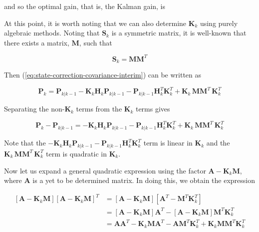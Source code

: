 and so the optimal gain, that is, the Kalman gain, is


At this point, it is worth noting that we can also determine $\mathbf{K}_k$ using purely
algebraic methods. Noting that $\mathbf{S}_k$ is a symmetric matrix, it is well-known
that there exists a matrix, $\mathbf{M}$, such that

\begin{equation*}
    \mathbf{S}_{k} = \mathbf{M} \mathbf{M}^T
\end{equation*}

Then (\ref{eq:state-correction-covariance-interim}) can be written as

\begin{equation*}
    \mathbf{P}_{k} = \mathbf{P}_{k|k-1} - \mathbf{K}_k \mathbf{H}_k \mathbf{P}_{k|k-1} - \mathbf{P}_{k|k-1} \mathbf{H}_k^T \mathbf{K}_k^T
    + \mathbf{K}_k \, \mathbf{M} \mathbf{M}^T \, \mathbf{K}_k^T
\end{equation*}

Separating the non-$\mathbf{K}_k$ terms from the $\mathbf{K}_k$ terms gives

\begin{equation}
    \mathbf{P}_{k} - \mathbf{P}_{k|k-1} = - \mathbf{K}_k \mathbf{H}_k \mathbf{P}_{k|k-1} - \mathbf{P}_{k|k-1} \mathbf{H}_k^T \mathbf{K}_k^T
    + \mathbf{K}_k \, \mathbf{M} \mathbf{M}^T \, \mathbf{K}_k^T
    \label{eq:Pk-Pkm1}
\end{equation}

Note that the $- \mathbf{K}_k \mathbf{H}_k \mathbf{P}_{k|k-1} - \mathbf{P}_{k|k-1} \mathbf{H}_k^T \mathbf{K}_k^T$
term is linear in $\mathbf{K}_{k}$ and the $\mathbf{K}_k \, \mathbf{M} \mathbf{M}^T \, \mathbf{K}_k^T$
term is quadratic in $\mathbf{K}_{k}$.

Now let us expand a general quadratic expression using the factor $\mathbf{A} - \mathbf{K}_k \mathbf{M}$,
where $\mathbf{A}$ is a yet to be determined matrix. In doing this, we obtain the expression

\begin{equation*}
    \begin{aligned}
        \left[ \mathbf{A} - \mathbf{K}_k \mathbf{M} \right] \left[ \mathbf{A} - \mathbf{K}_k \mathbf{M} \right]^T
        &= \left[ \mathbf{A} - \mathbf{K}_k \mathbf{M} \right] \left[ \mathbf{A}^T - \mathbf{M}^T \mathbf{K}_k^T \right] \\
        &= \left[ \mathbf{A} - \mathbf{K}_k \mathbf{M} \right] \mathbf{A}^T - \left[ \mathbf{A} - \mathbf{K}_k \mathbf{M} \right] \mathbf{M}^T \mathbf{K}_k^T \\
        &= \mathbf{A} \mathbf{A}^T - \mathbf{K}_k \mathbf{M} \mathbf{A}^T - \mathbf{A} \mathbf{M}^T \mathbf{K}_k^T + \mathbf{K}_k \mathbf{M} \mathbf{M}^T \mathbf{K}_k^T
    \end{aligned}
\end{equation*}

